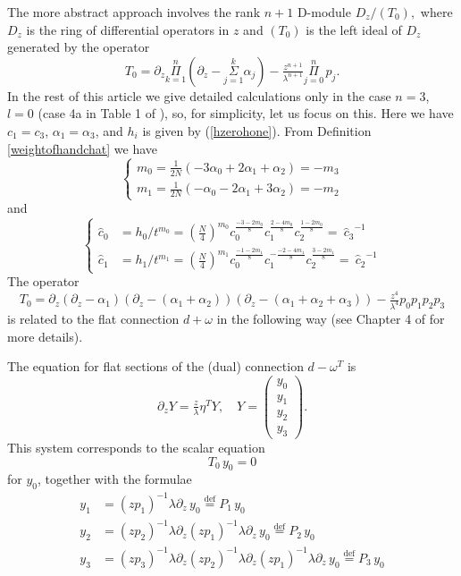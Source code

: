 \documentclass[a4paper,12pt,leqno]{amsart}
\numberwithin{equation}{section}
\theoremstyle{plain}
\theoremstyle{definition}
\newcommand{\al}{\alpha}
\newcommand{\la}{\lambda}
\newcommand{\om}{\omega}
\renewcommand{\b}{\partial}
\newcommand{\bz}{\b_z}
\newcommand{\bp}{\begin{pmatrix}}
\newcommand{\ep}{\end{pmatrix}}
\newcommand{\nn}{m}
\begin{document}
The more abstract approach involves the rank $n+1$ D-module 
$
D_z/(T_0),
$
where $D_z$ is the ring of differential operators in $z$ and $(T_0)$ is the left ideal of $D_z$ generated by the operator
\[
T_0=\b_z
\overset{\scriptscriptstyle n}{\underset{\scriptstyle k=1}\Pi}
(\b_z-
\overset{\scriptscriptstyle k}{\underset{\scriptstyle j=1}\Sigma}
\al_j)
-\tfrac{z^{n+1}}{\la^{n+1}} 
\overset{\scriptscriptstyle n}{\underset{\scriptstyle j=0}\Pi}
\, p_j.
\]
In the rest of this article we give detailed calculations only in the case $n=3$, $l=0$ (case 4a in Table 1 of \cite{GuItLiXX}), so, for simplicity,  let us focus on this.  
Here we have $c_1=c_3$, $\al_1=\al_3$, and 
$h_i$ is given by (\ref{hzerohone}).  From Definition \ref{weightofhandchat} we have
\begin{equation}\label{weights}
\begin{cases}
\nn_0 = \tfrac1{2N}(-3\al_0+2\al_1+\al_2)=-\nn_3
\\
\nn_1= \tfrac1{2N}(-\al_0-2\al_1+3\al_2)=-\nn_2
\end{cases}
\end{equation}
and
\begin{equation}\label{chat}
\begin{cases}
\hat c_0&= h_0/t^{\nn_0} 
=
\left( \tfrac N4 \right)^{\nn_0} 
c_0^{\frac{-3-2\nn_0}8}c_1^{\frac{2-4\nn_0}8}c_2^{\frac{1-2\nn_0}8} 
=
\ {\hat c_3}^{-1}
\\
\hat c_1&=h_1/t^{\nn_1}
=
\left( \tfrac N4 \right)^{\nn_1}
c_0^{\frac{-1-2\nn_1}{8}}c_1^{-\frac{-2-4\nn_1}{8}}c_2^{\frac{3-2\nn_1}{8}}
=
\ {\hat c_2}^{-1}
\end{cases}
\end{equation}
The operator
\[
T_0=\b_z(\b_z-\al_1)(\b_z-(\al_1+\al_2))(\b_z-(\al_1+\al_2+\al_3))
-\tfrac{z^4}{\la^4} p_0p_1p_2p_3
\]
is related to the flat connection $d+\om$ in the following way (see Chapter 4 of \cite{Gu08} for more details).  

The equation for flat sections of the (dual) connection $d-\om^T$ is
\begin{equation}\label{omsec}
\bz Y =\tfrac z\la \eta^T Y,\quad
Y=
\bp
y_0 \\ y_1 \\ y_2 \\ y_3
\ep.
\end{equation}
This system corresponds to the scalar equation 
\[
T_0 \, y_0=0
\]
for $y_0$, together with
the formulae
\begin{align*}
y_1&= (zp_1)^{-1}\la\bz \,y_0\overset{\scriptstyle \text{def} }=P_1\,y_0 
\\ 
y_2& = (zp_2)^{-1}\la\bz (zp_1)^{-1}\la\bz \,y_0\overset{\scriptstyle \text{def} }= P_2\,y_0
\\
y_3&= (zp_3)^{-1}\la\bz (zp_2)^{-1}\la\bz (zp_1)^{-1}\la\bz \,y_0 \overset{\scriptstyle \text{def} }= P_3\,y_0 
\end{align*}
\end{document}
